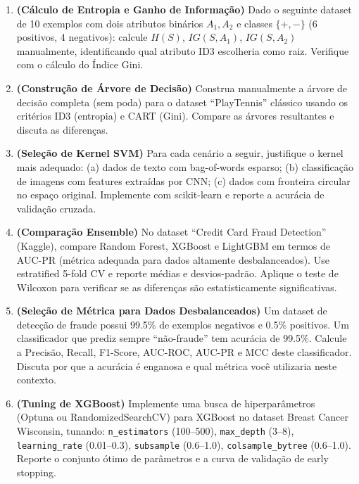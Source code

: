 \documentclass[12pt,a4paper]{article}
\begin{document}
\begin{enumerate}[leftmargin=2em,label=\textcolor{mineblue}{\textbf{E\arabic*.}}]

  \item \textbf{(Cálculo de Entropia e Ganho de Informação)} Dado o seguinte dataset de 10 exemplos com dois atributos binários $A_1, A_2$ e classes $\{+, -\}$ (6 positivos, 4 negativos): calcule $H(S)$, $IG(S, A_1)$, $IG(S, A_2)$ manualmente, identificando qual atributo ID3 escolheria como raiz. Verifique com o cálculo do Índice Gini.

  \item \textbf{(Construção de Árvore de Decisão)} Construa manualmente a árvore de decisão completa (sem poda) para o dataset ``PlayTennis'' clássico usando os critérios ID3 (entropia) e CART (Gini). Compare as árvores resultantes e discuta as diferenças.

  \item \textbf{(Seleção de Kernel SVM)} Para cada cenário a seguir, justifique o kernel mais adequado: (a) dados de texto com bag-of-words esparso; (b) classificação de imagens com features extraídas por CNN; (c) dados com fronteira circular no espaço original. Implemente com scikit-learn e reporte a acurácia de validação cruzada.

  \item \textbf{(Comparação Ensemble)} No dataset ``Credit Card Fraud Detection'' (Kaggle), compare Random Forest, XGBoost e LightGBM em termos de AUC-PR (métrica adequada para dados altamente desbalanceados). Use estratified 5-fold CV e reporte médias e desvios-padrão. Aplique o teste de Wilcoxon para verificar se as diferenças são estatisticamente significativas.

  \item \textbf{(Seleção de Métrica para Dados Desbalanceados)} Um dataset de detecção de fraude possui 99.5\% de exemplos negativos e 0.5\% positivos. Um classificador que prediz sempre ``não-fraude'' tem acurácia de 99.5\%. Calcule a Precisão, Recall, F1-Score, AUC-ROC, AUC-PR e MCC deste classificador. Discuta por que a acurácia é enganosa e qual métrica você utilizaria neste contexto.

  \item \textbf{(Tuning de XGBoost)} Implemente uma busca de hiperparâmetros (Optuna ou RandomizedSearchCV) para XGBoost no dataset Breast Cancer Wisconsin, tunando: \texttt{n\_estimators} (100--500), \texttt{max\_depth} (3--8), \texttt{learning\_rate} (0.01--0.3), \texttt{subsample} (0.6--1.0), \texttt{colsample\_bytree} (0.6--1.0). Reporte o conjunto ótimo de parâmetros e a curva de validação de early stopping.


\end{enumerate}
\end{document}
